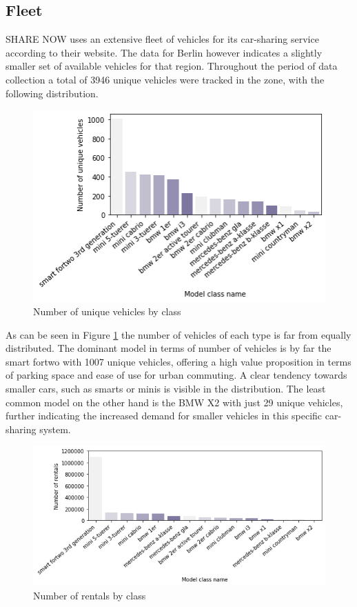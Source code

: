 \subsection{Fleet}
\label{sub_sec:CaseStudy/Fleet}

SHARE NOW uses an extensive fleet of vehicles for its car-sharing service according to their website. The data
for Berlin however indicates a slightly smaller set of available vehicles for that region. Throughout the
period of data collection a total of 3946 unique vehicles were tracked in the zone, with the following
distribution.

\begin{figure}[htbp]
  \centering
  \includegraphics[width=.5\linewidth]{./Figures/fleet.png}
  \caption{Number of unique vehicles by class}
  \label{fig:Fleet}
\end{figure}

As can be seen in Figure \ref{fig:Fleet} the number of vehicles of each type is far from equally distributed.
The dominant model in terms of number of vehicles is by far the smart fortwo with 1007 unique vehicles, 
offering a high value proposition
in terms of parking space and ease of use for urban commuting. A clear tendency towards smaller cars, such as smarts
or minis is visible in the distribution. The least common model on the other hand is the BMW X2 with just 29 unique vehicles,
further indicating the increased demand for smaller vehicles in this specific car-sharing system.

\begin{figure}[htbp]
  \centering
  \includegraphics[width=.5\linewidth]{./Figures/travels.png}
  \caption{Number of rentals by class}
  \label{fig:Rentals}
\end{figure}

